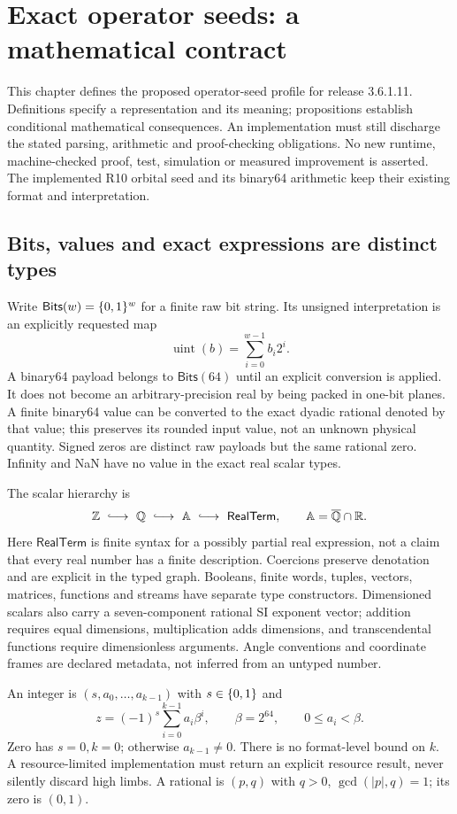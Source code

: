 \section{Exact operator seeds: a mathematical contract}
\label{sec:exact-core}
This chapter defines the proposed  operator-seed profile for
release 3.6.1.11. Definitions specify a representation and its meaning;
propositions establish conditional mathematical consequences. An implementation
must still discharge the stated parsing, arithmetic and proof-checking
obligations. No new runtime, machine-checked proof, test, simulation or measured
improvement is asserted. The implemented R10 orbital seed and its binary64
arithmetic keep their existing format and interpretation.

\subsection{Bits, values and exact expressions are distinct types}
Write $\mathsf{Bits}(w)=\{0,1\}^w$ for a finite raw bit string. Its unsigned
interpretation is an explicitly requested map
\[
 \operatorname{uint}(b)=\sum_{i=0}^{w-1}b_i2^i.
\]
A binary64 payload belongs to $\mathsf{Bits}(64)$ until an explicit conversion
is applied. It does not become an arbitrary-precision real by being packed in
one-bit planes. A finite binary64 value can be converted to the exact dyadic
rational denoted by that value; this preserves its rounded input value, not an
unknown physical quantity. Signed zeros are distinct raw payloads but the same
rational zero. Infinity and NaN have no value in the exact real scalar types.

The scalar hierarchy is
\[
 \Z\ \lhook\joinrel\longrightarrow\ \mathbb Q
 \ \lhook\joinrel\longrightarrow\ \mathbb A
 \ \lhook\joinrel\longrightarrow\ \mathsf{RealTerm},
 \qquad \mathbb A=\overline{\mathbb Q}\cap\R.
\]
Here $\mathsf{RealTerm}$ is finite syntax for a possibly partial real expression,
not a claim that every real number has a finite description. Coercions preserve
denotation and are explicit in the typed graph. Booleans, finite words, tuples,
vectors, matrices, functions and streams have separate type constructors.
Dimensioned scalars also carry a seven-component rational SI exponent vector;
addition requires equal dimensions, multiplication adds dimensions, and
transcendental functions require dimensionless arguments. Angle conventions and
coordinate frames are declared metadata, not inferred from an untyped number.

An integer is $(s,a_0,\ldots,a_{k-1})$ with $s\in\{0,1\}$ and
\[
 z=(-1)^s\sum_{i=0}^{k-1}a_i\beta^i,
 \qquad \beta=2^{64},\qquad 0\le a_i<\beta.
\]
Zero has $s=0,k=0$; otherwise $a_{k-1}\ne0$. There is no format-level bound on
$k$. A resource-limited implementation must return an explicit resource result,
never silently discard high limbs. A rational is $(p,q)$ with $q>0$,
$\gcd(|p|,q)=1$; its zero is $(0,1)$.

